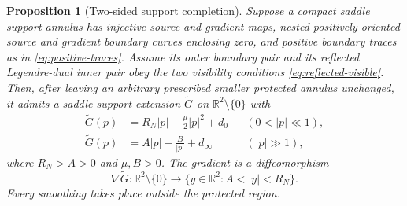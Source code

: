 \documentclass[11pt]{amsart}
\newtheorem{proposition}[theorem]{Proposition}
\theoremstyle{definition}
\theoremstyle{remark}
\numberwithin{equation}{section}
\begin{document}
\begin{proposition}[Two-sided support completion]\label{prop:dual-radial-completion}
Suppose a compact saddle support annulus has injective source and
gradient maps, nested positively oriented source and gradient boundary
curves enclosing zero, and positive boundary traces as in
\eqref{eq:positive-traces}. Assume its outer boundary pair and its
reflected Legendre-dual inner pair obey the two visibility conditions
\eqref{eq:reflected-visible}. Then, after leaving an arbitrary
prescribed smaller protected annulus unchanged, it admits a saddle
support extension $\widetilde G$ on $\mathbb R^2\setminus\{0\}$ with
\begin{equation}\label{eq:radial-two-ends}
 \begin{aligned}
 \widetilde G(p)&=R_N|p|-\frac\mu2|p|^2+d_0
     && (0<|p|\ll1),\\
 \widetilde G(p)&=A|p|-\frac B{|p|}+d_\infty
     && (|p|\gg1),
 \end{aligned}
\end{equation}
where $R_N>A>0$ and $\mu,B>0$. The gradient is a
diffeomorphism
\begin{equation}\label{eq:full-gradient-annulus}
 \nabla\widetilde G:\mathbb R^2\setminus\{0\}
       \longrightarrow \{y\in\mathbb R^2:A<|y|<R_N\}.
\end{equation}
Every smoothing takes place outside the protected region.
\end{proposition}
\end{document}
